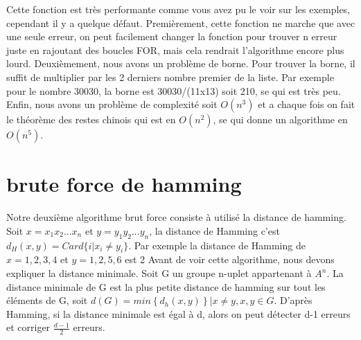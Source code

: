 \documentclass[a4paper, 11pt]{report}
\begin{document}
\newline
Cette fonction est très performante comme vous avez pu le voir sur les exemples, cependant il y a quelque défaut. Premièrement, cette fonction ne marche que avec une seule erreur,
on peut facilement changer la fonction pour trouver n erreur juste en rajoutant des boucles FOR, mais cela rendrait l'algorithme encore plus lourd. Deuxièmement, nous avons un problème de borne. Pour trouver la borne,
il suffit de multiplier par les 2 derniers nombre premier de la liste. \newline
Par exemple pour le nombre 30030, la borne est 30030/(11x13) soit 210, se qui est très peu.\newline
Enfin, nous avons un problème de complexité soit $O(n^3)$ et a chaque fois on fait le théorème des restes chinois qui est en $O(n^2)$, se qui donne un algorithme en $O(n^5)$.




\newpage
\section{brute force de hamming}

Notre deuxième algorithme brut force consiste à utilisé la distance de hamming. Soit $x=x_1x_2 ... x_n$ et $y=y_1y_2 ... y_n$, la distance de Hamming c'est
$d_H(x,y)=Card\{  i\vert x_i \neq y_i \}$. Par exemple la distance de Hamming de $x={1,2,3,4}$ et $y={1,2,5,6}$ est 2\newline
Avant de voir cette algorithme, nous devons expliquer la distance minimale. Soit G un groupe n-uplet appartenant à $A^n$. La distance minimale de G est la plus petite distance de hamming sur tout les éléments de G, soit $d(G)=min{\left\{d_h(x,y)\right\} | x\neq y, x,y\in G}$.
D'après Hamming, si la distance minimale est égal à d, alors on peut détecter d-1 erreurs et corriger $\frac{d-1}{2}$ erreurs. \newline
\end{document}
